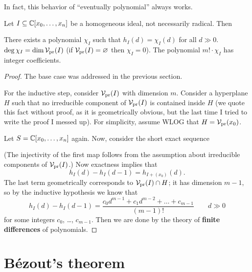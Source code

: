 In fact, this behavior of ``eventually polynomial'' always works.
\begin{theorem}
	\label{thm:hilbert_polynomial}
	Let $I \subseteq \mathbb C[x_0, \dots, x_n]$ be a homogeneous ideal,
	not necessarily radical. Then
	\begin{enumerate}[(a)]
		\ii There exists a polynomial $\chi_I$ such that
		$h_I(d) = \chi_I(d)$ for all $d \gg 0$.
		\ii $\deg \chi_I = \dim\mathcal V_{\text{pr}}(I)$ (if $\mathcal V_{\text{pr}}(I) = \varnothing$
		then $\chi_I = 0$).
		\ii The polynomial $m! \cdot \chi_I$ has integer coefficients.
	\end{enumerate}
\end{theorem}
\begin{proof}
	The base case was addressed in the previous section.

	For the inductive step, consider $\mathcal V_{\text{pr}}(I)$ with dimension $m$.
	Consider a hyperplane $H$ such that no irreducible
	component of $\mathcal V_{\text{pr}}(I)$ is contained inside $H$
	(we quote this fact without proof, as it is geometrically obvious,
	but the last time I tried to write the proof I messed up).
	For simplicity, assume WLOG that $H = \mathcal V_{\text{pr}}(x_0)$.

	Let $S = \mathbb C[x_0, \dots, x_n]$ again.
	Now, consider the short exact sequence
	\begin{center}
	\end{center}
	(The injectivity of the first map follows from the assumption
	about irreducible components of $\mathcal V_{\text{pr}}(I)$.)
	Now exactness implies that
	\[ h_I(d) - h_I(d-1) = h_{I + (x_0)}(d). \]
	The last term geometrically corresponds to $\mathcal V_{\text{pr}}(I) \cap H$;
	it has dimension $m-1$, so by the inductive hypothesis
	we know that
	\[ h_I(d) - h_I(d-1)
		= \frac{c_0 d^{m-1} + c_1 d^{m-2} + \dots + c_{m-1}}{(m-1)!}
		\qquad d \gg 0 \]
	for some integers $c_0$, \dots, $c_{m-1}$.
	Then we are done by the theory of
	\textbf{finite differences} of polynomials.
\end{proof}

\section{B\'ezout's theorem}

